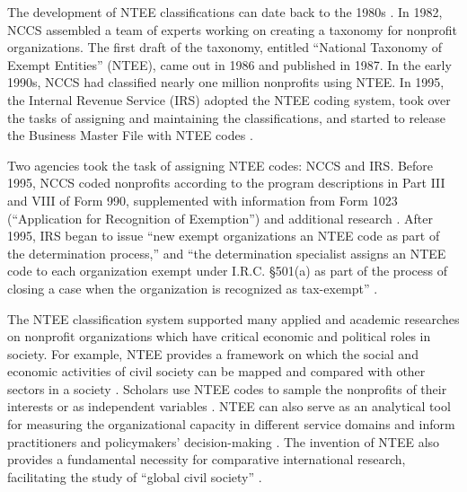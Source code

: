 \documentclass[11pt]{article}
\begin{document}
The development of NTEE classifications can date back to the 1980s \parencite[8-9, 11]{HodgkinsonMappingnonprofitsector1990}. In 1982, NCCS assembled a team of experts working on creating a taxonomy for nonprofit organizations. The first draft of the taxonomy, entitled ``National Taxonomy of Exempt Entities'' (NTEE), came out in 1986 and published in 1987. In the early 1990s, NCCS had classified nearly one million nonprofits using NTEE. In 1995, the Internal Revenue Service (IRS) adopted the NTEE coding system, took over the tasks of assigning and maintaining the classifications, and started to release the Business Master File with NTEE codes \parencite{USInternalRevenueServiceExemptOrganizationsBusiness2014,USInternalRevenueServiceIRSStaticFiles2013}.

Two agencies took the task of assigning NTEE codes: NCCS and IRS. Before 1995, NCCS coded nonprofits according to the program descriptions in Part III and VIII of Form 990, supplemented with information from Form 1023 (``Application for Recognition of Exemption'') and additional research \parencite[16]{NationalCenterforCharitableStatisticsGuideUsingNCCS2006}. After 1995, IRS began to issue ``new exempt organizations an NTEE code as part of the determination process,'' and ``the determination specialist assigns an NTEE code to each organization exempt under I.R.C. \S 501(a) as part of the process of closing a case when the organization is recognized as tax-exempt'' \parencite[1]{USInternalRevenueServiceIRSStaticFiles2013}.

The NTEE classification system supported many applied and academic researches on nonprofit organizations which have critical economic and political roles in society. For example, NTEE provides a framework on which the social and economic activities of civil society can be mapped and compared with other sectors in a society \parencite[e.g.,][]{RoegerNonprofitSectorIts2015}. Scholars use NTEE codes to sample the nonprofits of their interests \parencite[e.g.,][]{OktenDeterminantsdonationsprivate2000,SharkeyCommunityCrimeDecline2017,McVeighStructuralInfluencesActivism2006,VasiNoFrackingWay2015} or as independent variables \parencite{SloanEffectsNonprofitAccountability2009}. NTEE can also serve as an analytical tool for measuring the organizational capacity in different service domains and inform practitioners and policymakers' decision-making \parencite{Hodgkinsonnewresearchplanning1991}. The invention of NTEE also provides a fundamental necessity for comparative international research, facilitating the study of ``global civil society'' \parencite{VakilConfrontingclassificationproblem1997,Salamonsearchnonprofitsector1992,Salamoninternationalclassificationnonprofit1996,HodgkinsonMappingnonprofitsector1990}.
\end{document}
